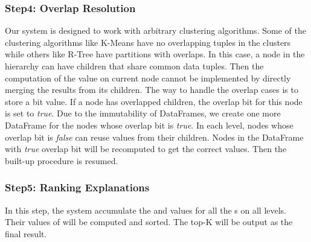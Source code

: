 \subsubsection{Step4: Overlap Resolution}
Our system is designed to work with arbitrary clustering algorithms. 
Some of the clustering algorithms like K-Means have no overlapping tuples in the clusters while others like R-Tree have partitions with overlaps. 
In this case, a node in the hierarchy can have children that share common data tuples. 
Then the computation of the value on current node cannot be implemented by directly merging the results from its children. 
The way to handle the overlap cases is to store a bit value.
If a node has overlapped children, the overlap bit for this node is set to \emph{true}. 
Due to the immutability of DataFrames, we create one more DataFrame for the nodes whose overlap bit is \emph{true}. 
In each level, nodes whose overlap bit is \emph{false} can reuse values from their children. Nodes in the DataFrame with \emph{true} overlap bit will be recomputed to get the correct values. 
Then the built-up procedure is resumed. 



\subsubsection{Step5: Ranking Explanations}
\label{sec:extending_hi}
In this step, the system accumulate the {\intensity} and {\influence} values for all the {\explanation}s on all levels. Their values of {\newvalue} will be computed and sorted. The top-K {\explanation} will be output as the final result. 

